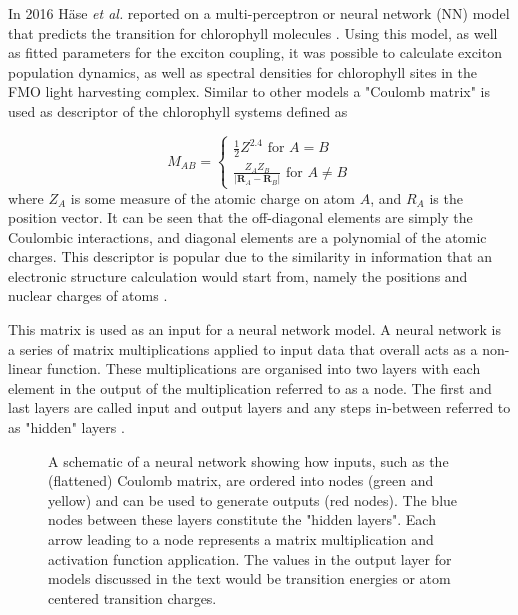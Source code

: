 In 2016 H\"{a}se \emph{et al.} reported on a multi-perceptron or neural network (NN)
model that predicts the \Qy transition for chlorophyll molecules \cite{AspuruGuzik2016}.
Using this model, as well as fitted parameters for the exciton coupling, it was 
possible to calculate exciton population dynamics, as well as spectral densities
for chlorophyll sites in the FMO light harvesting complex. Similar to other models
a "Coulomb matrix" \cite{Rupp2012a, Montavon2013} is used as descriptor of the chlorophyll
systems defined as 

\begin{equation}
	M_{AB} = 
	  \begin{cases}
		\frac{1}{2} Z^{2.4} \text{ for } A = B\\
		\frac{Z_A Z_B}{\left\lvert \mathbf{R}_A - \mathbf{R}_B\right\rvert} \text{ for } A \neq B
	  \end{cases}
\end{equation}
%
where $Z_A$ is some measure of the atomic charge on atom $A$, and $R_A$ is the position
vector. It can be seen that the off-diagonal elements are simply the Coulombic interactions,
and diagonal elements are a polynomial of the atomic charges. This descriptor is
popular due to the similarity in information that an electronic structure calculation
would start from, namely the positions and nuclear charges of atoms \cite{Raghunathan2022}.

This matrix is used as an input for a neural network model. A neural network is 
a series of matrix multiplications applied to input data that overall acts as a
non-linear function. These multiplications are organised into two layers with each 
element in the output of the multiplication referred to as a node. The first and
last layers are called  input and output layers and any steps in-between referred
to as "hidden" layers \cite{Rumelhart1986}.

\begin{figure}
	\centering
	\begin{neuralnetwork}[height=4]
        \hiddenlayer[count=4, bias=false, title=Hidden\\layer 1] \linklayers
        \hiddenlayer[count=3, bias=false, title=Hidden\\layer 2] \linklayers
        \outputlayer[count=2, title=Output\\layer] \linklayers
	\end{neuralnetwork}
	\caption{A schematic of a neural network showing how inputs, such as the
	(flattened) Coulomb matrix, are ordered into nodes (green and yellow) and can
	be used to generate outputs (red nodes). The blue nodes between these layers
	constitute the "hidden layers". Each arrow leading to a node represents a matrix
	multiplication and activation function application. The values in the output
	layer for models discussed in the text would be \Qy transition energies or atom
	centered transition charges.}
	\label{fig:neural_network}
\end{figure}

